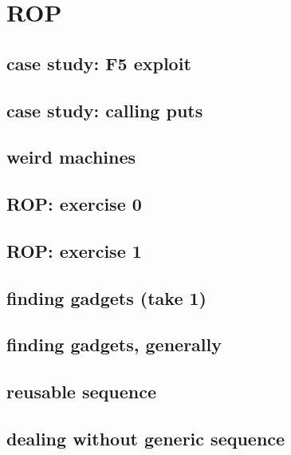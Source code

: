 
\section{ROP}


\subsection{case study: F5 exploit}


\subsection{case study: calling puts}


\subsection{weird machines}


\subsection{ROP: exercise 0}


\subsection{ROP: exercise 1}


\subsection{finding gadgets (take 1)}


\subsection{finding gadgets, generally}



\subsection{reusable sequence}


\subsection{dealing without generic sequence}



